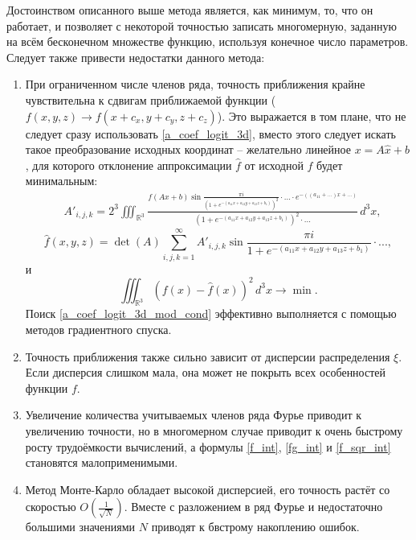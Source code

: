 Достоинством описанного выше метода является, как минимум, то, что он работает, и позволяет с некоторой точностью записать многомерную, заданную на всём бесконечном множестве функцию, используя конечное число параметров. Следует также привести недостатки данного метода:
\begin{enumerate}
\item При ограниченном числе членов ряда, точность приближения крайне чувствительна к сдвигам приближаемой функции ($f(x, y, z) \to f(x+c_x, y+c_y, z+c_z)$). Это выражается в том плане, что  не следует сразу использовать \ref{a_coef_logit_3d}, вместо этого следует искать такое преобразование исходных координат -- желательно линейное $x = A\hat{x} + b$, для которого отклонение аппроксимации $\hat{f}$ от исходной $f$ будет минимальным:
\begin{align}
	&A'_{i,j,k} = 2^3\iiint_{\mathbb{R}^3}\frac{f(Ax+b)\sin\frac{\pi i}{(1+e^{-(a_{11}x+a_{12}y+a_{13}z+b_1)})^2}\cdot...\cdot e^{-((a_{11}+...)x+...)}}{(1+e^{-(a_{11}x+a_{12}y+a_{13}z+b_1)})^2\cdot...}\, d^3x,
	\label{a_coef_logit_3d_mod}
\end{align}
\begin{equation}
	\hat{f}(x,y,z) = \det(A)\sum_{i,j,k=1}^\infty A'_{i,j,k}\sin{\frac{\pi i}{1 + e^{-(a_{11}x+a_{12}y+a_{13}z+b_1)}}}\cdot...,
	\label{logit_fourier_3d_mod}
\end{equation}
и
\begin{equation}
	\iiint_{\mathbb{R}^3}{(f(x) - \hat{f}(x))}^2\,d^3x \to \min.
	\label{a_coef_logit_3d_mod_cond}
\end{equation}
Поиск \ref{a_coef_logit_3d_mod_cond} эффективно выполняется с помощью методов градиентного спуска.

\item Точность приближения также сильно зависит от дисперсии распределения $\xi$. Если дисперсия слишком мала, она может не покрыть всех особенностей функции $f$.

\item Увеличение количества учитываемых членов ряда Фурье приводит к увеличению точности, но в многомерном случае приводит к очень быстрому росту трудоёмкости вычислений, а формулы \ref{f_int}, \ref{fg_int} и \ref{f_sqr_int} становятся малоприменимыми.

\item Метод Монте-Карло обладает высокой дисперсией, его точность растёт со скоростью $O(\frac{1}{\sqrt{N}})$. Вместе с разложением в ряд Фурье и недостаточно большими значениями $N$ приводят к бвстрому накоплению ошибок.
\end{enumerate}

